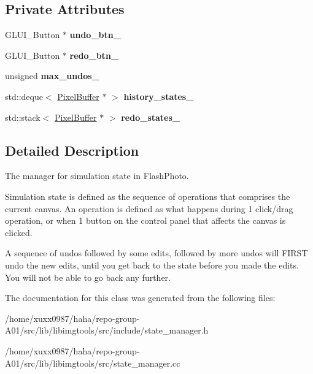 \subsection*{Private Attributes}
\begin{DoxyCompactItemize}
\item 
G\+L\+U\+I\+\_\+\+Button $\ast$ {\bfseries undo\+\_\+btn\+\_\+}\hypertarget{classimage__tools_1_1StateManager_adbe2820d914eb5ba08de3dfcc61aa82d}{}\label{classimage__tools_1_1StateManager_adbe2820d914eb5ba08de3dfcc61aa82d}

\item 
G\+L\+U\+I\+\_\+\+Button $\ast$ {\bfseries redo\+\_\+btn\+\_\+}\hypertarget{classimage__tools_1_1StateManager_a6fd0aef5e8fc7b52cf6f9de416ac4825}{}\label{classimage__tools_1_1StateManager_a6fd0aef5e8fc7b52cf6f9de416ac4825}

\item 
unsigned {\bfseries max\+\_\+undos\+\_\+}\hypertarget{classimage__tools_1_1StateManager_a01880162d6098bca3fa61e551365c214}{}\label{classimage__tools_1_1StateManager_a01880162d6098bca3fa61e551365c214}

\item 
std\+::deque$<$ \hyperlink{classimage__tools_1_1PixelBuffer}{Pixel\+Buffer} $\ast$ $>$ {\bfseries history\+\_\+states\+\_\+}\hypertarget{classimage__tools_1_1StateManager_afbf08670a705b087ae0e0235404151dd}{}\label{classimage__tools_1_1StateManager_afbf08670a705b087ae0e0235404151dd}

\item 
std\+::stack$<$ \hyperlink{classimage__tools_1_1PixelBuffer}{Pixel\+Buffer} $\ast$ $>$ {\bfseries redo\+\_\+states\+\_\+}\hypertarget{classimage__tools_1_1StateManager_a451e9938df3ecde4fad4e45892a8634a}{}\label{classimage__tools_1_1StateManager_a451e9938df3ecde4fad4e45892a8634a}

\end{DoxyCompactItemize}


\subsection{Detailed Description}
The manager for simulation state in Flash\+Photo. 

Simulation state is defined as the sequence of operations that comprises the current canvas. An operation is defined as what happens during 1 click/drag operation, or when 1 button on the control panel that affects the canvas is clicked.

A sequence of undos followed by some edits, followed by more undos will F\+I\+R\+ST undo the new edits, until you get back to the state before you made the edits. You will not be able to go back any further. 

The documentation for this class was generated from the following files\+:\begin{DoxyCompactItemize}
\item 
/home/xuxx0987/haha/repo-\/group-\/\+A01/src/lib/libimgtools/src/include/state\+\_\+manager.\+h\item 
/home/xuxx0987/haha/repo-\/group-\/\+A01/src/lib/libimgtools/src/state\+\_\+manager.\+cc\end{DoxyCompactItemize}
